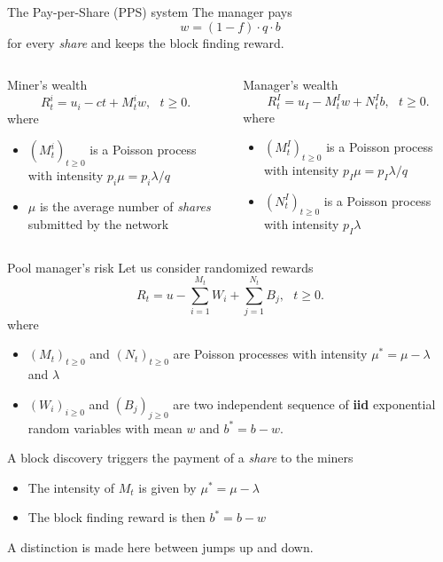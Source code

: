 \documentclass{beamer}
\makeatletter
\newcommand*{\iid}{\textbf{iid}\@\xspace}
\makeatother
\begin{document}
\begin{frame}{The Pay-per-Share (PPS) system}
\scriptsize
The manager pays
$$
w = (1-f)\cdot q \cdot b 
$$ 
for every \textit{share} and keeps the block finding reward.
\vspace{1cm}
\begin{columns}
\begin{column}{0.5\textwidth}
Miner's wealth
$$
R_t^i = u_i-ct + M_t^i w,\text{ }t\geq0.
$$
where 
\begin{itemize}
   \item $(M_t^i)_{t\geq0}$ is a Poisson process with intensity $p_i \mu= p_i\lambda / q$
   \item $\mu$ is the average number of \textit{shares} submitted by the network
\end{itemize}
\end{column}
\begin{column}{0.5\textwidth}
Manager's wealth
$$
R_t^I = u_I - M_t^I w+N_t^I b,\text{ }t\geq0.
$$
where 
\begin{itemize}
   \item $(M_t^I)_{t\geq0}$ is a Poisson process with intensity $p_I\mu =p_I\lambda / q$
   \item $(N_t^I)_{t\geq0}$ is a Poisson process with intensity $p_I\lambda$
\end{itemize}
\end{column}
\end{columns}
\end{frame}
\begin{frame}{Pool manager's risk}
\scriptsize
Let us consider randomized rewards
$$
R_t= u - \sum_{i=1}^{M_t} W_i +\sum_{j=1}^{N_t} B_j,\text{ }t\geq0.
$$
where
\begin{itemize}
  \item $(M_t)_{t\geq0}$ and $(N_t)_{t\geq0}$ are Poisson processes with intensity $\mu^\ast=\mu- \lambda$ and $\lambda$
  \item $(W_i)_{i\geq0}$ and $(B_j)_{j\geq0}$ are two independent sequence of \iid exponential random variables with mean $w$ and $b^\ast = b-w$.
\end{itemize}
\begin{tcolorbox}[enhanced,drop shadow, title=Poisson process superposition]
A block discovery triggers the payment of a \textit{share} to the miners
\begin{itemize}
\item The intensity of $M_t$ is given by $\mu^\ast=\mu- \lambda$ 
\item The block finding reward is then $b^\ast = b-w$ 
\end{itemize}
A distinction is made here between jumps up and down.
\end{tcolorbox}
\end{frame}
\end{document}
